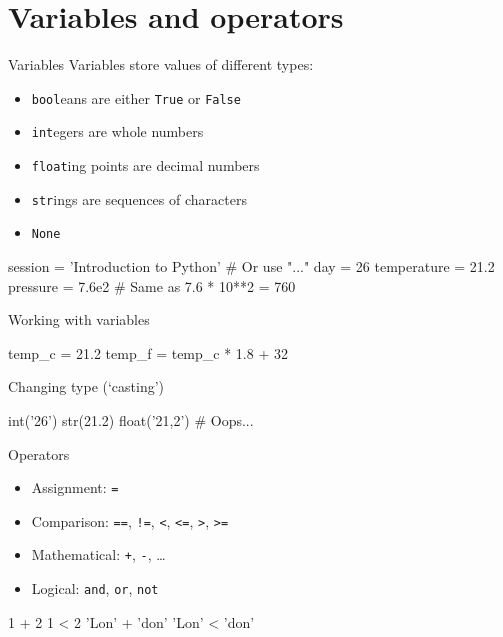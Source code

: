 \section{Variables and operators}

\begin{frame}[fragile]{Variables}
    Variables store values of different \alert{types}:
    \begin{itemize}
        \item \texttt{bool}eans are either \texttt{True}
              or \texttt{False}
        \item \texttt{int}egers are whole numbers
        \item \texttt{float}ing points are decimal numbers
        \item \texttt{str}ings are sequences of characters
        \item \texttt{None}
    \end{itemize}
    \vfill
    \begin{py3}
        session = 'Introduction to Python'  # Or use "..."
        day = 26
        temperature = 21.2
        pressure = 7.6e2  # Same as 7.6 * 10**2 = 760
    \end{py3}
\end{frame}

\begin{frame}[fragile]{Working with variables}
    \begin{py3}
        temp_c = 21.2
        temp_f = temp_c * 1.8 + 32
    \end{py3}
    \vfill\pause
    \begin{block}{Changing type (`casting')}
        \begin{py3}
            int('26')
            str(21.2)
            float('21,2')  # Oops...
        \end{py3}
    \end{block}
\end{frame}

\begin{frame}[fragile]{Operators}
    \begin{itemize}
        \setlength{\itemsep}{0.75em}
        \item Assignment: \texttt{=}
        \item Comparison: \texttt{==}, \texttt{!=},
                          \texttt{<}, \texttt{<=},
                          \texttt{>}, \texttt{>=}
        \item Mathematical: \texttt{+}, \texttt{-},
                            \ldots
        \item Logical: \texttt{and}, \texttt{or},
                       \texttt{not}
    \end{itemize}
    \vfill
    \begin{py3}
        1 + 2
        1 < 2
        'Lon' + 'don'
        'Lon' < 'don'
    \end{py3}
\end{frame}

